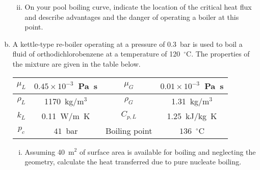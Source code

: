 \documentclass[calculator,datasheet,handbook]{exam}
\begin{document}
\begin{question}
\begin{enumerate}[a)]
\begin{enumerate}[i)]
{      }
    \item On your pool boiling curve, indicate the location of the
      critical heat flux and describe advantages and the danger of
      operating a boiler at this point.%
    \end{enumerate}
  \item A kettle-type re-boiler operating at a pressure of 0.3~bar is
    used to boil a fluid of orthodichlorobenzene at a temperature of
    120~${}^\circ$C. The properties of the mixture are given in the
    table below.
    \begin{center}
      \begin{tabular}{|c|c||c|c|}\hline
        $\mu_L$ & $0.45\times10^{-3}$~Pa~s & 
        $\mu_G$ & $0.01\times10^{-3}$~Pa~s \\\hline
        $\rho_L$ & 1170~kg/m${}^3$ &
        $\rho_G$ & 1.31~kg/m${}^3$ \\\hline
        $k_L$ & 0.11~W/m~K 
        & $C_{p,L}$ & 1.25~kJ/kg~K\\\hline
        $p_c$ & $41$~bar & Boiling point & $136$~${}^\circ$C\\\hline
      \end{tabular}
    \end{center}
    \begin{enumerate}[i)]
    \item Assuming 40~m${}^2$ of surface area is available for boiling
      and neglecting the geometry, calculate the heat transferred due
      to pure nucleate boiling.%
       
\end{enumerate}
\end{enumerate}
\end{question}
\end{document}
